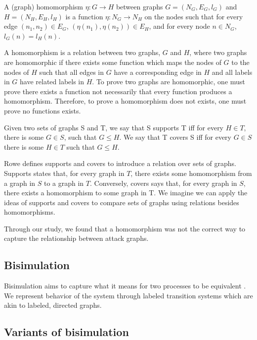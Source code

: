 \begin{definition}[Homomorphism]
    A (graph) homomorphism $\eta : G \to H$ between graphs $G = (N_G, E_G, l_G)$ and $H = (N_H, E_H, l_H)$ is a function $\eta : N_G \to N_H$ on the nodes such that for every edge $(n_1, n_2) \in E_G$, $(\eta(n_1), \eta(n_2)) \in E_H$, and for every node $n \in N_G$, $l_G(n) = l_H(n)$.  \cite{Rowe:2021:OnOrdering}
\end{definition}

A homomorphism is a relation between two graphs, $G$ and $H$, where two graphs are homomorphic if there exists some function which maps the nodes of $G$ to the nodes of $H$ such that all edges in $G$ have a corresponding edge in $H$ and all labels in $G$ have related labels in $H$. To prove two graphs are homomorphic, one must prove there exists a function not necessarily that every function produces a homomorphism. Therefore, to prove a homomorphism does not exists, one must prove no functions exists. 

\begin{definition}
    Given two sets of graphs S and T, we say that S supports T iff for every $H \in T$, there is some $G \in S$, such that $G \leq H$. We  say that T covers S iff for every $G \in S$ there is some $H \in T$ such that $G \leq H. $\cite{Rowe:2021:OnOrdering}
\end{definition}

Rowe defines supports and covers to introduce a relation over sets of graphs. Supports states that, for every graph in $T$, there exists some homomorphism from a graph in $S$ to a graph in $T$. Conversely, covers says that, for every graph in $S$, there exists a homomorphism to some graph in T. We imagine we can apply the ideas of supports and covers to compare sets of graphs using relations besides homomorphisms. 

Through our study, we found that a homomorphism was not the correct way to capture the relationship between attack graphs. 

\subsection{Bisimulation}

Bisimulation aims to capture what it means for two processes to be equivalent \cite{sangiorgi_2011}. We represent behavior of the system through labeled transition systems which are akin to labeled, directed graphs. 


\subsection{Variants of bisimulation}




